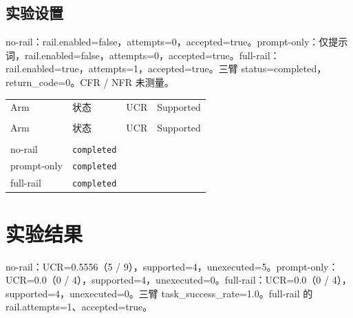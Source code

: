 \documentclass[UTF8]{ctexart}
\begin{document}
\subsection{实验设置}
no-\allowbreak{}rail：rail.enabled=false，attempts=0，accepted=true。prompt-\allowbreak{}only：仅提示词，rail.enabled=false，attempts=0，accepted=true。full-\allowbreak{}rail：rail.enabled=true，attempts=1，accepted=true。三臂 status=completed，return\_\allowbreak{}code=0。CFR / NFR 未测量。
\begin{longtable}{@{}>{\raggedright\arraybackslash}p{}>{\raggedright\arraybackslash}p{}>{\raggedleft\arraybackslash}p{}>{\raggedleft\arraybackslash}p{}@{}}
\toprule
Arm & 状态 & UCR & Supported\\\\
\midrule
\endfirsthead
\toprule
Arm & 状态 & UCR & Supported\\\\
\midrule
\endhead
no-\allowbreak{}rail & \texttt{\scriptsize completed} & 0.5556 & 4 \\
prompt-\allowbreak{}only & \texttt{\scriptsize completed} & 0.0 & 4 \\
full-\allowbreak{}rail & \texttt{\scriptsize completed} & 0.0 & 4 \\
\bottomrule
\end{longtable}
\section{实验结果}
no-\allowbreak{}rail：UCR=0.5556（5 / 9），supported=4，unexecuted=5。prompt-\allowbreak{}only：UCR=0.0（0 / 4），supported=4，unexecuted=0。full-\allowbreak{}rail：UCR=0.0（0 / 4），supported=4，unexecuted=0。三臂 task\_\allowbreak{}success\_\allowbreak{}rate=1.0。full-\allowbreak{}rail 的 rail.attempts=1、accepted=true。
\end{document}
